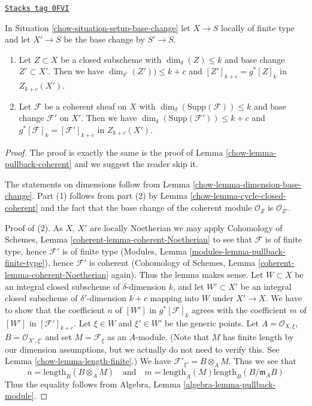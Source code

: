 \begin{lemma}
\label{chow-lemma-pullback-coherent-base-change}
\href{https://stacks.math.columbia.edu/tag/0FVI}{\texttt{Stacks tag 0FVI}}

In Situation \ref{chow-situation-setup-base-change} let $X \to S$
locally of finite type and let $X' \to S$ be the base change by $S' \to S$.
\begin{enumerate}
\item Let $Z \subset X$ be a closed subscheme with
$\dim_\delta(Z) \leq k$ and base change $Z' \subset X'$. Then we have
$\dim_{\delta'}(Z')) \leq k + c$
and $[Z']_{k + c} = g^*[Z]_k$ in $Z_{k + c}(X')$.
\item Let $\mathcal{F}$ be a coherent sheaf on $X$ with
$\dim_\delta(\text{Supp}(\mathcal{F})) \leq k$ and base
change $\mathcal{F}'$ on $X'$.
Then we have $\dim_\delta(\text{Supp}(\mathcal{F}')) \leq k + c$
and $g^*[\mathcal{F}]_k = [\mathcal{F}']_{k + c}$
in $Z_{k + c}(X')$.
\end{enumerate}
\end{lemma}

\begin{proof}

The proof is exactly the same is the proof of
Lemma \ref{chow-lemma-pullback-coherent}
and we suggest the reader skip it.

\medskip\noindent
The statements on dimensions follow from
Lemma \ref{chow-lemma-dimension-base-change}.
Part (1) follows from part (2) by Lemma \ref{chow-lemma-cycle-closed-coherent}
and the fact that the base change of the coherent module $\mathcal{O}_Z$
is $\mathcal{O}_{Z'}$.

\medskip\noindent
Proof of (2). As $X$, $X'$ are locally Noetherian we may apply
Cohomology of Schemes, Lemma \ref{coherent-lemma-coherent-Noetherian} to see
that $\mathcal{F}$ is of finite type, hence $\mathcal{F}'$ is
of finite type (Modules, Lemma \ref{modules-lemma-pullback-finite-type}),
hence $\mathcal{F}'$ is coherent
(Cohomology of Schemes, Lemma \ref{coherent-lemma-coherent-Noetherian} again).
Thus the lemma makes sense. Let $W \subset X$ be an integral closed
subscheme of $\delta$-dimension $k$, and let $W' \subset X'$ be
an integral closed subscheme of $\delta'$-dimension $k + c$ mapping into $W$
under $X' \to X$. We have to show that the coefficient $n$ of
$[W']$ in $g^*[\mathcal{F}]_k$ agrees with the coefficient
$m$ of $[W']$ in $[\mathcal{F}']_{k + c}$. Let $\xi \in W$ and
$\xi' \in W'$ be the generic points. Let
$A = \mathcal{O}_{X, \xi}$, $B = \mathcal{O}_{X', \xi'}$
and set $M = \mathcal{F}_\xi$ as an $A$-module. (Note that
$M$ has finite length by our dimension assumptions, but we
actually do not need to verify this. See
Lemma \ref{chow-lemma-length-finite}.)
We have $\mathcal{F}'_{\xi'} = B \otimes_A M$.
Thus we see that
$$
n = \text{length}_B(B \otimes_A M)
\quad
\text{and}
\quad
m = \text{length}_A(M) \text{length}_B(B/\mathfrak m_AB)
$$
Thus the equality follows from
Algebra, Lemma \ref{algebra-lemma-pullback-module}.
\end{proof}

